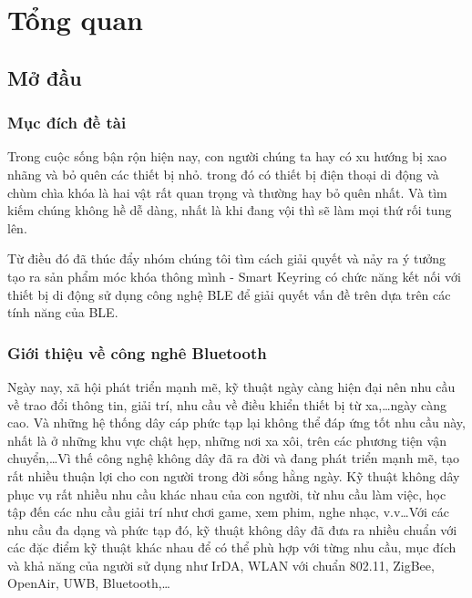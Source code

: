 
\chapter{Tổng quan}  %

\ifpdf
    \graphicspath{{Chapter1/Figs/Raster/}{Chapter1/Figs/PDF/}{Chapter1/Figs/}{}}
\else
    \graphicspath{{Chapter1/Figs/Vector/}{Chapter1/Figs/}}
\fi


\section{Mở đầu} %
\subsection{Mục đích đề tài}
Trong cuộc sống bận rộn hiện nay, con người chúng ta hay có xu hướng bị xao nhãng và bỏ quên các thiết bị nhỏ. trong đó có thiết bị điện thoại di động và chùm chìa khóa là hai vật rất quan trọng và thường hay bỏ quên nhất. Và tìm kiếm chúng không hề dễ dàng, nhất là khi đang vội thì sẽ làm mọi thứ rối tung lên.

Từ điều đó đã thúc đẩy nhóm chúng tôi tìm cách giải quyết và nảy ra ý tưởng tạo ra sản phẩm móc khóa thông mình - Smart Keyring có chức năng kết nối với thiết bị di động sử dụng công nghệ BLE để giải quyết vấn đề trên dựa trên các tính năng của BLE.
\subsection{Giới thiệu về công nghê Bluetooth}
Ngày nay, xã hội phát triển mạnh mẽ, kỹ thuật ngày càng hiện đại nên nhu cầu về trao đổi thông tin, giải trí, nhu cầu về điều khiển thiết bị từ xa,…ngày càng cao. Và những hệ thống dây cáp phức tạp lại không thể đáp ứng tốt nhu cầu này, nhất là ở những khu vực chật hẹp, những nơi xa xôi, trên các phương tiện vận chuyển,…Vì thế công nghệ không dây đã ra đời và đang phát triển mạnh mẽ, tạo rất nhiều thuận lợi cho con người trong đời sống hằng ngày. Kỹ thuật không dây phục vụ rất nhiều nhu cầu khác nhau của con người, từ nhu cầu làm việc, học tập đến các nhu cầu giải trí như chơi game, xem phim, nghe nhạc, v.v…Với các nhu cầu đa dạng và phức tạp đó, kỹ thuật không dây đã đưa ra nhiều chuẩn với các đặc điểm kỹ thuật khác nhau để có thể phù hợp với từng nhu cầu, mục đích và khả năng của người sử dụng như IrDA, WLAN với chuẩn 802.11, ZigBee, OpenAir, UWB, Bluetooth,…

